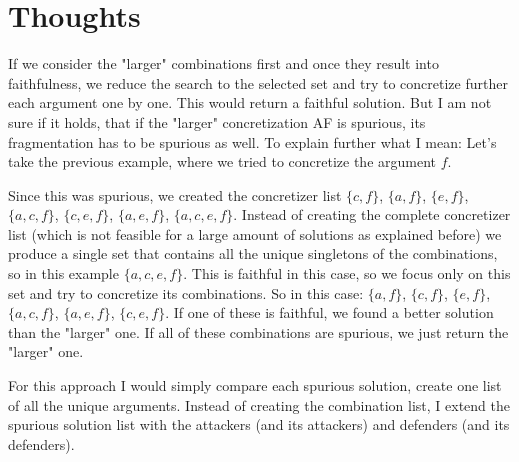 \documentclass[twoside,openright]{scrreprt}
\begin{document}
\section{Thoughts}
If we consider the "larger" combinations first and once they result into faithfulness, we reduce the search to the selected set and try to concretize further each argument one by one. This would return a faithful solution.
But I am not sure if it holds, that if the "larger" concretization AF is spurious, its fragmentation has to be spurious as well.
To explain further what I mean: Let's take the previous example, where we tried to concretize the argument $f$.
\begin{center}
\end{center}

Since this was spurious, we created the concretizer list $\{c, f\}$, $\{a, f\}$, $\{e, f\}$, $\{a, c, f\}$, $\{c, e, f\}$, $\{a, e, f\}$, $\{a, c, e, f\}$. Instead of creating the complete concretizer list (which is not feasible for a large amount of solutions as explained before)
we produce a single set that contains all the unique singletons of the combinations, so in this example  $\{a, c, e, f\}$. This is faithful in this case, so we focus only on this set and try to concretize its combinations. So in this case: $\{a, f\}$, $\{c, f\}$, $\{e, f\}$,  $\{a, c, f\}$, $\{a, e, f\}$, $\{c, e, f\}$. If one of these
is faithful, we found a better solution than the "larger" one. If all of these combinations are spurious, we just return the "larger" one.

For this approach I would simply compare each spurious solution, create one list of all the unique arguments. Instead of creating the combination list, I extend the spurious solution list with the attackers (and its attackers) and defenders (and its defenders).
\end{document}
